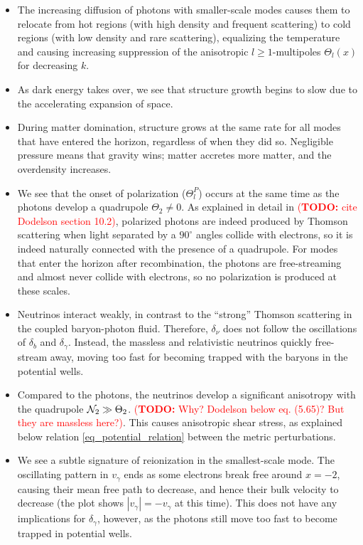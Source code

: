\documentclass[10pt,a4paper]{article}
\newcommand\TODO[1]{\textcolor{red}{(\textbf{TODO:} #1)}}
\begin{document}
\begin{itemize}
\item
The increasing diffusion of photons with smaller-scale modes
causes them to relocate
from hot regions (with high density and frequent scattering)
to cold regions (with low density and rare scattering),
equalizing the temperature and causing increasing suppression of the anisotropic $l \geq 1$-multipoles $\Theta_l(x)$ for decreasing $k$.

\item
As dark energy takes over,
we see that structure growth begins to slow due to the accelerating expansion of space.

\item
During matter domination,
structure grows at the same rate for all modes that have entered the horizon,
regardless of when they did so.
Negligible pressure means that gravity wins; matter accretes more matter, and the overdensity increases.

\item
We see that the onset of polarization ($\Theta^P_l$) occurs at the same time as the photons develop a quadrupole $\Theta_2 \neq 0$.
As explained in detail in \TODO{cite Dodelson section 10.2},
polarized photons are indeed produced by Thomson scattering when light separated by a $90^\circ$ angles collide with electrons,
so it is indeed naturally connected with the presence of a quadrupole.
For modes that enter the horizon after recombination,
the photons are free-streaming and almost never collide with electrons,
so no polarization is produced at these scales.

\item
Neutrinos interact weakly, in contrast to the ``strong'' Thomson scattering in the coupled baryon-photon fluid.
Therefore, $\delta_\nu$ does not follow the oscillations of $\delta_b$ and $\delta_\gamma$.
Instead, the massless and relativistic neutrinos quickly free-stream away, moving too fast for becoming trapped with the baryons in the potential wells.

\item
Compared to the photons, the neutrinos develop a significant anisotropy with the quadrupole $\mathcal{N}_2 \gg \Theta_2$.
\TODO{Why? Dodelson below eq. (5.65)? But they are massless here?}.
This causes anisotropic shear stress, as explained below relation \eqref{eq_potential_relation} between the metric perturbations.

\item
We see a subtle signature of reionization in the smallest-scale mode.
The oscillating pattern in $v_\gamma$ ends as some electrons break free around $x=-2$,
causing their mean free path to decrease, and hence their bulk velocity to decrease (the plot shows $|v_\gamma| = -v_\gamma$ at this time).
This does not have any implications for $\delta_\gamma$, however,
as the photons still move too fast to become trapped in potential wells.


\end{itemize}
\end{document}

